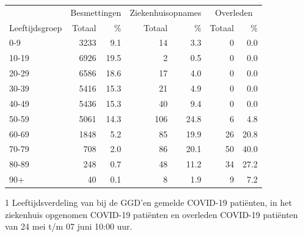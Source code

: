 \documentclass[
  english,
  man,floatsintext]{apa6}
\begin{document}
\begin{table}
\centering\begingroup\fontsize{11}{13}\selectfont

\begin{threeparttable}
\begin{tabular}{lrrrrrr}
\toprule
\multicolumn{1}{c}{ } & \multicolumn{2}{c}{Besmettingen} & \multicolumn{2}{c}{Ziekenhuisopnames} & \multicolumn{2}{c}{Overleden} \\
\cmidrule(l{3pt}r{3pt}){2-3} \cmidrule(l{3pt}r{3pt}){4-5} \cmidrule(l{3pt}r{3pt}){6-7}
Leeftijdsgroep & Totaal & \% & Totaal & \% & Totaal & \%\\
\midrule
0-9 & 3233 & 9.1 & 14 & 3.3 & 0 & 0.0\\
10-19 & 6926 & 19.5 & 2 & 0.5 & 0 & 0.0\\
20-29 & 6586 & 18.6 & 17 & 4.0 & 0 & 0.0\\
30-39 & 5416 & 15.3 & 21 & 4.9 & 0 & 0.0\\
40-49 & 5436 & 15.3 & 40 & 9.4 & 0 & 0.0\\
50-59 & 5061 & 14.3 & 106 & 24.8 & 6 & 4.8\\
60-69 & 1848 & 5.2 & 85 & 19.9 & 26 & 20.8\\
70-79 & 708 & 2.0 & 86 & 20.1 & 50 & 40.0\\
80-89 & 248 & 0.7 & 48 & 11.2 & 34 & 27.2\\
90+ & 40 & 0.1 & 8 & 1.9 & 9 & 7.2\\
\bottomrule
\end{tabular}
\begin{tablenotes}
\item[1] Leeftijdsverdeling van bij de GGD’en gemelde COVID-19 patiënten, in het ziekenhuis opgenomen COVID-19 patiënten en overleden COVID-19 patiënten van 24 mei t/m 07 juni 10:00 uur.
\end{tablenotes}
\end{threeparttable}
\endgroup{}
\end{table}

\newpage
\end{document}
